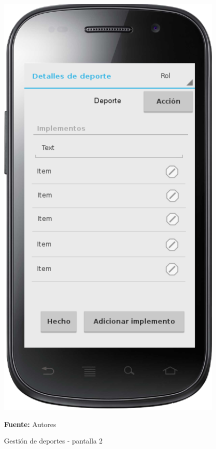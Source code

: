 \begin{figure}[!htb]
  \begin{center}
    \includegraphics[width=11cm]{./imagenes/UI/Deportes/gestion_deportes_2.png}
    \caption{Gestión de deportes - pantalla 2}
    \label{fig:gestion_deportes_2}
    \textbf{Fuente:}  Autores
  \end{center}
\end{figure}

